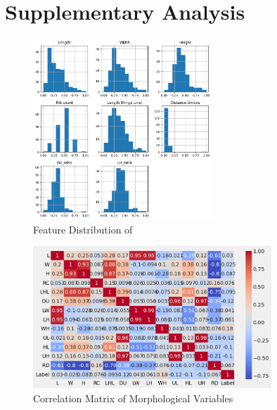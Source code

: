 %
%
%                 

\chapter{Supplementary Analysis}
\label{sec:appendixd}

%
%
%
%

\begin{figure}[!htbp]
	\centering
	\includegraphics[width=0.6\textwidth]{figures/sample_distribution.png}
	\caption{Feature Distribution of \Tegillarcagranosa}
\end{figure}

\begin{figure}[!htbp]
	\centering
	\includegraphics[width=0.8\textwidth]{figures/corr_matrix.png}
	\caption{Correlation Matrix of Morphological Variables \Tegillarcagranosa}
\end{figure}

